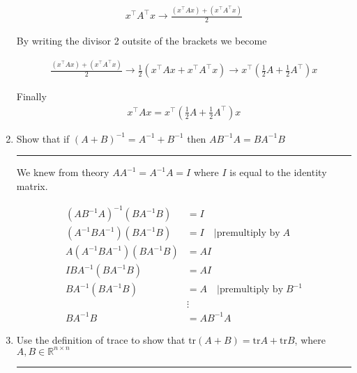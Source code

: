 \documentclass[12pt]{article}
\begin{document}
\begin{enumerate}
    \begin{align*}
        x^\intercal A^\intercal x \rightarrow \frac{(x^\intercal Ax) + (x^\intercal A^\intercal x)}{2}
    \end{align*}

    By writing the divisor 2 outsite of the brackets we become

    \begin{align*}
        \frac{(x^\intercal Ax) + (x^\intercal A^\intercal x)}{2} \rightarrow 
        \frac{1}{2} (x^\intercal Ax + x^\intercal A^\intercal x) \rightarrow 
         x^\intercal ( \frac{1}{2} A + \frac{1}{2} A^\intercal ) x
    \end{align*}

    Finally
    \begin{align*}
        x^\intercal Ax = x^\intercal ( \frac{1}{2} A + \frac{1}{2} A^\intercal ) x
    \end{align*}


    \item Show that if $(A + B)^{-1} = A^{-1} + B^{-1}$ then $A B^{-1} A = B A^{-1} B$
    
    \noindent\rule{\linewidth}{1pt}

    We knew from theory $A A^{-1} = A^{-1} A = I$ where $I$ is equal to the identity matrix.

    \begin{align*}
        (A B^{-1} A)^{-1} (B A^{-1} B) &= I \\
        (A^{-1}  B A^{-1} ) (B A^{-1} B) &= I \quad | \textrm{premultiply by} \; A \\
        A (A^{-1}  B A^{-1} ) (B A^{-1} B) &= A I\\
        I B A^{-1} (B A^{-1} B) &= A I\\
         B A^{-1} (B A^{-1} B) &= A \quad | \textrm{premultiply by} \; B^{-1}  \\
         &\vdots \\
         B A^{-1} B &= A B^{-1} A
    \end{align*}

    \item Use the definition of trace to show that $\textrm{tr}(A + B) = \textrm{tr}A + \textrm{tr}B$, where $A, B \in \mathbb{R}^{n \times n}$
    
    \noindent\rule{\linewidth}{1pt}


\end{enumerate}
\end{document}
